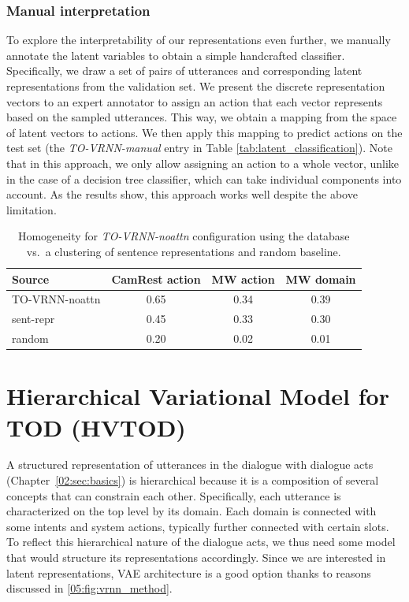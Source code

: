 \subsubsection{Manual interpretation}
\label{sec:manual}
To explore the interpretability of our representations even further, we manually annotate the latent variables to obtain a simple handcrafted classifier.
Specifically, we draw a set of pairs of utterances and corresponding latent representations from the validation set.
We present the discrete representation vectors to an expert annotator to assign an action that each vector represents based on the sampled utterances.
This way, we obtain a mapping from the space of latent vectors to actions.
We then apply this mapping to predict actions on the test set (the \textit{TO-VRNN-manual} entry in Table \ref{tab:latent_classification}).
Note that in this approach, we only allow assigning an action to a whole vector, unlike in the case of a decision tree classifier, which can take individual components into account.
As the results show, this approach works well despite the above limitation.

\begin{table}[tp]
    \centering\small
    
\begin{tabular}{l|c|c|c}
      \toprule
      \textbf{Source} &\textbf{ CamRest action} & \textbf{MW action} & \textbf{MW domain} \\
      \midrule
      TO-VRNN-noattn & 0.65 & 0.34 & 0.39 \\
      sent-repr & 0.45 & 0.33 & 0.30 \\
      random & 0.20 & 0.02 & 0.01 \\
      \bottomrule
  \end{tabular}
  \caption{Homogeneity for \emph{TO-VRNN-noattn} configuration using the database vs.~a clustering of sentence representations and random baseline.}
  \label{tab:homo}
\end{table}

\section{Hierarchical Variational Model for TOD (HVTOD)}
A structured representation of utterances in the dialogue with dialogue acts (Chapter~\ref{02:sec:basics}) is hierarchical because it is a composition of several concepts that can constrain each other.
Specifically, each utterance is characterized on the top level by its domain.
Each domain is connected with some intents and system actions, typically further connected with certain slots.
To reflect this hierarchical nature of the dialogue acts, we thus need some model that would structure its representations accordingly.
Since we are interested in latent representations, VAE architecture is a good option thanks to reasons discussed in \ref{05:fig:vrnn_method}.

